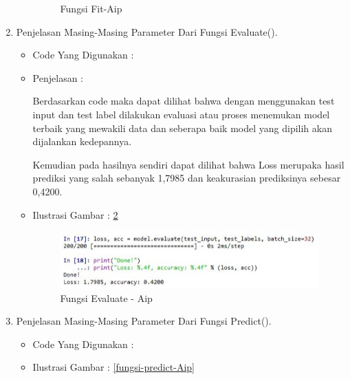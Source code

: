 \begin{enumerate}
\begin{itemize}
\begin{figure}[ht]
\caption{Fungsi Fit-Aip}
\label{fungsi-fit-Aip}
\end{figure}
\par
\end{itemize}
\par
\par
\item Penjelasan Masing-Masing Parameter Dari Fungsi Evaluate().
\begin{itemize}
\item Code Yang Digunakan :
\par

\par
\item Penjelasan :
\par Berdasarkan code maka dapat dilihat bahwa dengan menggunakan test input dan test label dilakukan evaluasi atau proses menemukan model terbaik yang mewakili data dan seberapa baik model yang dipilih akan dijalankan kedepannya. 
\par Kemudian pada hasilnya sendiri dapat dilihat bahwa Loss merupaka hasil prediksi yang salah sebanyak 1,7985 dan keakurasian prediksinya sebesar 0,4200.
\par
\par
\item Ilustrasi Gambar : \ref{fungsi-evaluate-Aip}
\par
\begin{figure}[ht]
\centering
\includegraphics[scale=0.2]{figures/AIP/evaluate.PNG}
\caption{Fungsi Evaluate - Aip}
\label{fungsi-evaluate-Aip}
\end{figure}
\par
\par
\par
\end{itemize}
\item Penjelasan Masing-Masing Parameter Dari Fungsi Predict().
\begin{itemize}
\item Code Yang Digunakan :
\par

\par
\par
\item Ilustrasi Gambar : \ref{fungsi-predict-Aip}

\end{itemize}
\end{enumerate}
